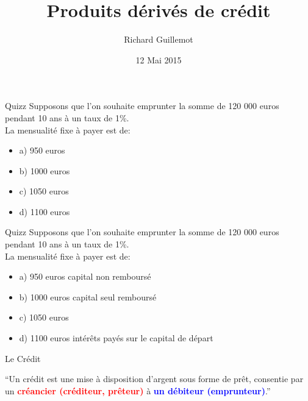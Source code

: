 \documentclass{beamer}
\title[Produits dérivés de change et de credit]{Produits dérivés de crédit}
\author{Richard Guillemot}
\institute{DIFIQ}
\date{12 Mai 2015}
\begin{document}
\begin{frame}
\titlepage
\end{frame}

\begin{frame}{Quizz}
Supposons que l'on souhaite emprunter la somme de 120 000 euros pendant 10 ans à un taux de 1\%.\\

\vspace{0.5cm}
La mensualité fixe à payer est de:
\begin{itemize}
\item a) 950 euros
\item b) 1000 euros
\item c) 1050 euros
\item d) 1100 euros
\end{itemize}

\end{frame}

\begin{frame}{Quizz}
Supposons que l'on souhaite emprunter la somme de 120 000 euros pendant 10 ans à un taux de 1\%.\\

\vspace{0.5cm}
La mensualité fixe à payer est de:
\begin{itemize}
\item a) 950 euros \textbf{\color{red}{FAUX}} capital non remboursé
\item b) 1000 euros \textbf{\color{red}{FAUX}} capital seul remboursé
\item c) 1050 euros \textbf{\color{green}{VRAI}}
\item d) 1100 euros \textbf{\color{red}{VRAI}} intérêts payés sur le capital de départ
\end{itemize}

\end{frame}



\begin{frame}{Le Crédit}

\begin{exampleblock}{}
  {\large ``Un crédit est une mise à disposition d'argent sous forme de prêt, consentie par un \textcolor{red}{\textbf{créancier (créditeur, prêteur)}} à \textcolor{blue}{\textbf{un débiteur (emprunteur)}}.''}
\end{exampleblock}
\vspace{0.5cm}
\end{frame}
\end{document}
